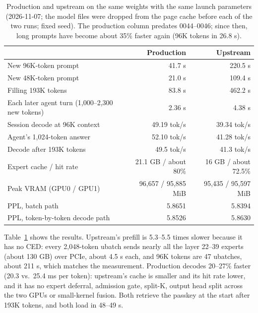 \documentclass[11pt,a4paper]{article}
\newcommand{\tps}{tok/s}
\begin{document}
\begin{table}[h]
  \centering
  \small
  \caption{Production and upstream on the same weights with the same launch parameters (2026-11-07; the model files were dropped from the page cache before each of the two runs; fixed seed). The production column predates 0044--0046; since then, long prompts have become about 35\% faster again (96K tokens in 26.8 s).}
  \label{tab:upstream}
  \begin{tabular}{@{}l r r@{}}
    \toprule
     & Production & Upstream \\
    \midrule
    New 96K-token prompt & 41.7 s & 220.5 s \\
    New 48K-token prompt & 21.0 s & 109.4 s \\
    Filling 193K tokens & 83.8 s & 462.2 s \\
    Each later agent turn (1,000--2,300 new tokens) & 2.36 s & 4.38 s \\
    Session decode at 96K context & 49.19 \tps{} & 39.34 \tps{} \\
    Agent's 1,024-token answer & 52.10 \tps{} & 41.28 \tps{} \\
    Decode after 193K tokens & 49.5 \tps{} & 41.3 \tps{} \\
    Expert cache / hit rate & 21.1 GB / about 80\% & 16 GB / about 72.5\% \\
    Peak VRAM (GPU0 / GPU1) & 96,657 / 95,885 MiB & 95,435 / 95,597 MiB \\
    PPL, batch path & 5.8651 & 5.8394 \\
    PPL, token-by-token decode path & 5.8526 & 5.8630 \\
    \bottomrule
  \end{tabular}
\end{table}

Table~\ref{tab:upstream} shows the results. Upstream's prefill is 5.3--5.5 times slower because it has no CED: every 2,048-token ubatch sends nearly all the layer 22--39 experts (about 130 GB) over PCIe, about 4.5 s each, and 96K tokens are 47 ubatches, about 211 s, which matches the measurement. Production decodes 20--27\% faster (20.3 vs.\ 25.4 ms per token): upstream's cache is smaller and its hit rate lower, and it has no expert deferral, admission gate, split-K, output head split across the two GPUs or small-kernel fusion. Both retrieve the passkey at the start after 193K tokens, and both load in 48--49 s.
\end{document}
